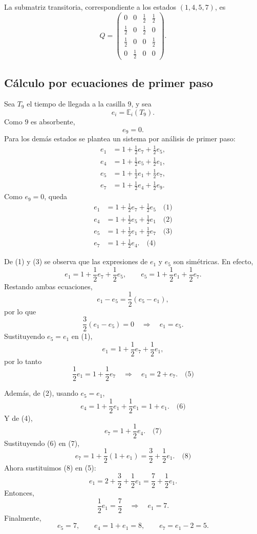 \documentclass[12pt,a4paper]{article}
\newcommand{\E}{\mathbb{E}}
\theoremstyle{definition}
\begin{document}
La submatriz transitoria, correspondiente a los estados \((1,4,5,7)\), es
\[
Q=
\begin{pmatrix}
0 & 0 & \frac12 & \frac12\\
\frac12 & 0 & \frac12 & 0\\
\frac12 & 0 & 0 & \frac12\\
0 & \frac12 & 0 & 0
\end{pmatrix}.
\]

\subsection{Cálculo por ecuaciones de primer paso}

Sea \(T_9\) el tiempo de llegada a la casilla \(9\), y sea
\[
    e_i=\E_i(T_9).
\]
Como \(9\) es absorbente,
\[
    e_9=0.
\]
Para los demás estados se plantea un sistema por análisis de primer paso:
\[
\begin{aligned}
 e_1 &=1+\frac12e_7+\frac12e_5,\\
 e_4 &=1+\frac12e_5+\frac12e_1,\\
 e_5 &=1+\frac12e_1+\frac12e_7,\\
 e_7 &=1+\frac12e_4+\frac12e_9.
\end{aligned}
\]
Como \(e_9=0\), queda
\[
\begin{aligned}
 e_1 &=1+\frac12e_7+\frac12e_5\quad\text{(1)}\\
 e_4 &=1+\frac12e_5+\frac12e_1\quad\text{(2)}\\
 e_5 &=1+\frac12e_1+\frac12e_7\quad\text{(3)}\\
 e_7 &=1+\frac12e_4.\quad\text{(4)}
\end{aligned}
\]

De (1) y (3) se observa que las expresiones de \(e_1\) y \(e_5\) son simétricas. En efecto,
\[
    e_1=1+\frac12e_7+\frac12e_5,
    \qquad
    e_5=1+\frac12e_1+\frac12e_7.
\]
Restando ambas ecuaciones,
\[
    e_1-e_5=\frac12(e_5-e_1),
\]
por lo que
\[
    \frac32(e_1-e_5)=0
    \quad\Longrightarrow\quad
    e_1=e_5.
\]
Sustituyendo \(e_5=e_1\) en (1),
\[
    e_1=1+\frac12e_7+\frac12e_1,
\]
por lo tanto
\[
    \frac12e_1=1+\frac12e_7
    \quad\Longrightarrow\quad
    e_1=2+e_7.\quad\text{(5)}
\]

Además, de (2), usando \(e_5=e_1\),
\[
    e_4=1+\frac12e_1+\frac12e_1=1+e_1.\quad\text{(6)}
\]
Y de (4),
\[
    e_7=1+\frac12e_4.\quad\text{(7)}
\]
Sustituyendo (6) en (7),
\[
    e_7=1+\frac12(1+e_1)=\frac32+\frac12e_1.\quad\text{(8)}
\]
Ahora sustituimos (8) en (5):
\[
    e_1=2+\frac32+\frac12e_1
    =\frac72+\frac12e_1.
\]
Entonces,
\[
    \frac12e_1=\frac72
    \quad\Longrightarrow\quad
    e_1=7.
\]
Finalmente,
\[
    e_5=7,
    \qquad
    e_4=1+e_1=8,
    \qquad
    e_7=e_1-2=5.
\]
\end{document}
